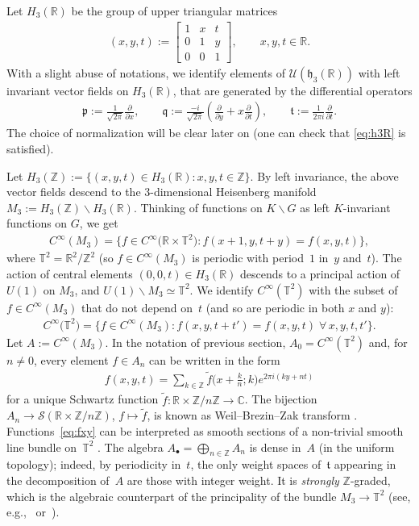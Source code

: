 \documentclass[10pt,a4paper]{amsart}
\numberwithin{equation}{section}
\theoremstyle{definition}
\newcommand{\U}{\mathcal{U}}
\newcommand{\R}{\mathbb{R}}
\newcommand{\C}{\mathbb{C}}
\newcommand{\Z}{\mathbb{Z}}
\newcommand{\T}{\mathbb{T}}
\newcommand{\mc}{\mathcal}
\newcommand{\mf}{\mathfrak}
\newcommand{\ga}{\mf{p}}
\newcommand{\gb}{\mf{q}}
\newcommand{\gc}{\mf{t}}
\begin{document}
Let $H_3(\R)$ be the group of upper triangular matrices
\begin{gather*}
(x,y,t):=\left[ \begin{matrix}
1 & x & t \\ 0 & 1 & y \\ 0 & 0 & 1
\end{matrix} \right] ,\qquad x,y,t\in\R.
\end{gather*}
With a slight abuse of notations, we identify elements of $\U(\mf{h}_3(\R))$ with left invariant vector f\/ields on $H_3(\R)$, that are generated by the dif\/ferential operators
\begin{gather*}%
\ga:=\frac{1}{\sqrt{2\pi}}\frac{\partial}{\partial x}
,\qquad
\gb:=\frac{-i}{\sqrt{2\pi}}\left(\frac{\partial}{\partial y}+x\frac{\partial}{\partial t}\right)
,\qquad
\gc:=\frac{1}{2\pi i}\frac{\partial}{\partial t}
.
\end{gather*}
The choice of normalization will be clear later on (one can check that \eqref{eq:h3R} is satisf\/ied).

Let $H_3(\Z):=\{(x,y,t)\in H_3(\R)\colon x,y,t\in\Z\}$.
By left invariance, the above vector f\/ields descend to the
$3$-dimensional Heisenberg manifold $M_3:=H_3(\Z)\backslash H_3(\R)$.
Thinking of functions on $K\backslash G$ as left $K$-invariant functions on $G$, we get
\begin{gather*}
C^\infty(M_3)=\big\{f\in C^\infty\big(\R\times\T^2\big)\colon f(x+1,y,t+y)=f(x,y,t)\big\} ,
\end{gather*}
where $\T^2=\R^2/\Z^2$ (so $f\in C^\infty(M_3)$ is periodic with period~$1$ in~$y$ and~$t$).
The action of central elements $(0,0,t)\in H_3(\R)$ descends to a principal action of $U(1)$ on $M_3$, and $U(1)\backslash M_3\simeq\T^2$. We identify
$C^\infty(\T^2)$ with the subset of $f\in C^\infty(M_3)$ that do not depend on~$t$ (and so are periodic in both $x$ and $y$):
\begin{gather*}
C^\infty\big(\T^2\big)=\big\{f\in C^\infty(M_3)\colon f(x,y,t+t')=f(x,y,t)\; \forall\,x,y,t,t'\big\} .
\end{gather*}
Let $A:=C^\infty(M_3)$. In the notation of previous section, $A_0=
C^\infty(\T^2)$ and, for $n\neq 0$, every element $f\in A_n$ can be written in the form
\begin{gather}\label{eq:fxy}
f(x,y,t)=\sum_{k\in\Z}\widetilde{f}\big(x+\tfrac{k}{n};k\big)e^{2\pi i(ky+nt)}
\end{gather}
for a unique Schwartz function $\widetilde{f}\colon \R\times\Z/n\Z\to\C$.
The bijection $A_n\to\mc{S}(\R\times\Z/n\Z)$, $f\mapsto\widetilde{f}$, is known as Weil--Brezin--Zak transform \cite[Section~1.10]{Fol89}.
Functions~\eqref{eq:fxy} can be interpreted as smooth sections of a non-trivial smooth line bundle on~$\T^2$ \cite{DFF13}.
The algebra $A_\bullet=\bigoplus_{n\in\Z}A_n$ is dense in~$A$ (in the uniform topology); indeed, by periodicity in~$t$, the only weight spaces of~$\gc$ appearing in the decomposition of~$A$ are those with integer weight.
It is \emph{strongly} $\Z$-graded, which is the algebraic counterpart of the principality of the bundle $M_3\to\T^2$ (see, e.g.,~\cite{ADL15} or~\cite{D15}).
\end{document}
